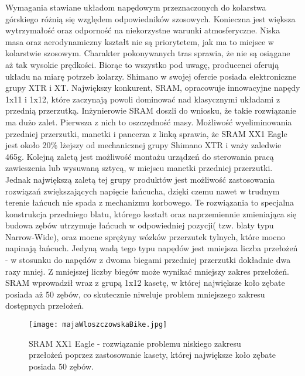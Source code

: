 Wymagania stawiane układom napędowym przeznaczonych do kolarstwa górskiego różnią się względem odpowiedników szosowych. Konieczna jest większa wytrzymałość oraz odporność na niekorzystne warunki atmosferyczne. Niska masa oraz aerodynamiczny kształt nie są priorytetem, jak ma to miejsce w kolarstwie szosowym. Charakter pokonywanych tras sprawia, że nie są osiągane aż tak wysokie prędkości. Biorąc to wszystko pod uwagę, producenci oferują układu na miarę potrzeb kolarzy. Shimano w swojej ofercie posiada elektroniczne grupy XTR i XT. Największy konkurent, SRAM, opracowuje innowacyjne napędy 1x11 i 1x12, które zaczynają powoli dominować nad klasycznymi układami z przednią przerzutką. Inżynierowie SRAM doszli do wniosku, że takie rozwiązanie ma dużo zalet. Pierwsza z nich to oszczędność masy. Możliwość wyeliminowania przedniej przerzutki, manetki i pancerza z linką sprawia, że SRAM XX1 Eagle jest około 20\% lżejszy od mechanicznej grupy Shimano XTR \cite{sramEagle}\cite{shimanoXtr} i waży zaledwie 465g. Kolejną zaletą jest możliwość montażu urządzeń do sterowania pracą zawieszenia lub wysuwaną sztycą, w miejscu manetki przedniej przerzutki. Jednak największą zaletą tej grupy produktów jest możliwość zastosowania rozwiązań zwiększających napięcie łańcucha, dzięki czemu nawet w trudnym terenie łańcuch nie spada z mechanizmu korbowego. Te rozwiązania to specjalna konstrukcja przedniego blatu, którego kształt oraz naprzemiennie zmieniająca się budowa zębów utrzymuje łańcuch w odpowiedniej pozycji( tzw. blaty typu Narrow-Wide), oraz mocne sprężyny wózków przerzutek tylnych, które mocno napinają łańcuch. Jedyną wadą tego typu napędów jest mniejsza liczba przełożeń - w stosunku do napędów z dwoma biegami przedniej przerzutki dokładnie dwa razy mniej. Z mniejszej liczby biegów może wynikać mniejszy zakres przełożeń. SRAM wprowadził wraz z grupą 1x12 kasetę, w której największe koło zębate posiada aż 50 zębów, co skutecznie niweluje problem mniejszego zakresu dostępnych przełożeń.

\begin{figure}[h]
    \centering
    \texttt{[image: majaWloszczowskaBike.jpg]}
    \caption{SRAM XX1 Eagle - rozwiązanie problemu niskiego zakresu przełożeń poprzez zastosowanie kasety, której największe koło zębate posiada 50 zębów.}
    \label{fig:majkaBike}
\end{figure}

